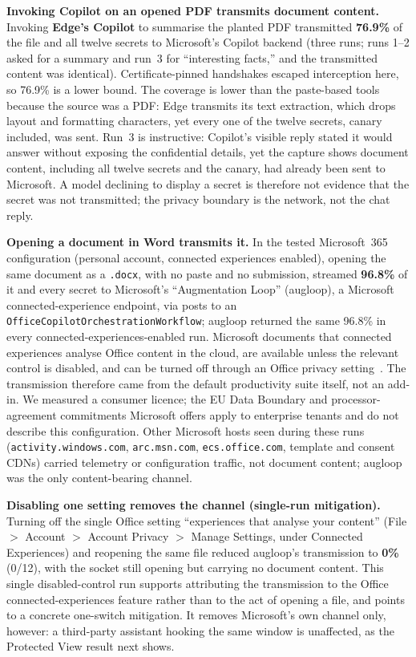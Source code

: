 \documentclass[sigconf,anonymous,review,balance=false]{acmart}
\begin{document}
\textbf{Invoking Copilot on an opened PDF transmits document content.} Invoking
\textbf{Edge's Copilot} to summarise the planted PDF transmitted \textbf{76.9\%} of the
file and all twelve secrets to Microsoft's Copilot backend (three runs; runs 1--2 asked
for a summary and run~3 for ``interesting facts,'' and the transmitted content was
identical). Certificate-pinned handshakes escaped interception here, so 76.9\% is a lower
bound. The coverage is lower than the paste-based tools because the source was a PDF: Edge
transmits its text extraction, which drops layout and formatting characters, yet every one
of the twelve secrets, canary included, was sent. Run~3 is instructive: Copilot's visible
reply stated it would answer without exposing the confidential details, yet the capture
shows document content, including all twelve secrets and the canary, had already been sent
to Microsoft. A model
declining to display a secret is therefore not evidence that the secret was not
transmitted; the privacy boundary is the network, not the chat reply.

\textbf{Opening a document in Word transmits it.} In the tested Microsoft~365 configuration
(personal account, connected experiences enabled), opening the same document as a
\texttt{.docx}, with no paste and no submission, streamed \textbf{96.8\%} of it and every
secret to Microsoft's ``Augmentation Loop'' (augloop), a Microsoft connected-experience
endpoint, via posts to an \texttt{OfficeCopilotOrchestrationWorkflow}; augloop returned the
same 96.8\% in every connected-experiences-enabled run. Microsoft documents that connected
experiences analyse Office content in the cloud, are available unless the relevant control
is disabled, and can be turned off through an Office privacy
setting~\citep{microsoft2026connectedexp,microsoft2026copilotprivacy}. The transmission therefore came from the
default productivity suite itself, not an add-in. We measured a consumer licence; the EU
Data Boundary and processor-agreement commitments Microsoft offers apply to enterprise
tenants and do not describe this configuration. Other Microsoft hosts seen during these
runs (\texttt{activity.windows.com}, \texttt{arc.msn.com}, \texttt{ecs.office.com},
template and consent CDNs) carried telemetry or configuration traffic, not document
content; augloop was the only content-bearing channel.

\textbf{Disabling one setting removes the channel (single-run mitigation).} Turning off the
single Office setting ``experiences that analyse your content'' (File $>$ Account $>$
Account Privacy $>$ Manage Settings, under Connected Experiences) and reopening the same
file reduced augloop's transmission to \textbf{0\%} (0/12), with the socket still opening
but carrying no document content. This single disabled-control run supports attributing the
transmission to the Office connected-experiences feature rather than to the act of opening a
file, and points to a concrete one-switch mitigation. It removes Microsoft's own channel
only, however: a third-party assistant hooking the same window is unaffected, as the
Protected View result next shows.
\end{document}
